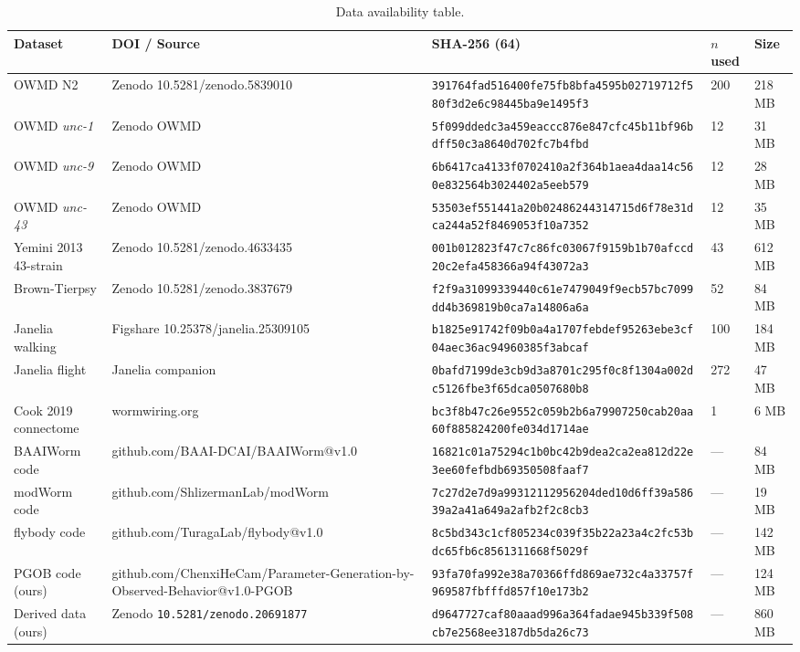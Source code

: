\documentclass[11pt]{article}
\begin{document}
\begin{table}[H]\centering\tiny
\begin{tabular}{p{} p{} p{} p{} p{}}\toprule
Dataset & DOI / Source & SHA-256 (64) & $n$ used & Size \\\midrule
OWMD N2 & Zenodo 10.5281/zenodo.5839010 & \texttt{391764fad516400fe75fb8bfa4595b02719712f580f3d2e6c98445ba9e1495f3} & 200 & 218 MB \\
OWMD \textit{unc-1} & Zenodo OWMD & \texttt{5f099ddedc3a459eaccc876e847cfc45b11bf96bdff50c3a8640d702fc7b4fbd} & 12 & 31 MB \\
OWMD \textit{unc-9} & Zenodo OWMD & \texttt{6b6417ca4133f0702410a2f364b1aea4daa14c560e832564b3024402a5eeb579} & 12 & 28 MB \\
OWMD \textit{unc-43} & Zenodo OWMD & \texttt{53503ef551441a20b02486244314715d6f78e31dca244a52f8469053f10a7352} & 12 & 35 MB \\
Yemini 2013 43-strain & Zenodo 10.5281/zenodo.4633435 & \texttt{001b012823f47c7c86fc03067f9159b1b70afccd20c2efa458366a94f43072a3} & 43 & 612 MB \\
Brown-Tierpsy & Zenodo 10.5281/zenodo.3837679 & \texttt{f2f9a31099339440c61e7479049f9ecb57bc7099dd4b369819b0ca7a14806a6a} & 52 & 84 MB \\
Janelia walking & Figshare 10.25378/janelia.25309105 & \texttt{b1825e91742f09b0a4a1707febdef95263ebe3cf04aec36ac94960385f3abcaf} & 100 & 184 MB \\
Janelia flight & Janelia companion & \texttt{0bafd7199de3cb9d3a8701c295f0c8f1304a002dc5126fbe3f65dca0507680b8} & 272 & 47 MB \\
Cook 2019 connectome & wormwiring.org & \texttt{bc3f8b47c26e9552c059b2b6a79907250cab20aa60f885824200fe034d1714ae} & 1 & 6 MB \\
BAAIWorm code & github.com/BAAI-DCAI/BAAIWorm@v1.0 & \texttt{16821c01a75294c1b0bc42b9dea2ca2ea812d22e3ee60fefbdb69350508faaf7} & --- & 84 MB \\
modWorm code & github.com/ShlizermanLab/modWorm & \texttt{7c27d2e7d9a99312112956204ded10d6ff39a58639a2a41a649a2afb2f2c8cb3} & --- & 19 MB \\
flybody code & github.com/TuragaLab/flybody@v1.0 & \texttt{8c5bd343c1cf805234c039f35b22a23a4c2fc53bdc65fb6c8561311668f5029f} & --- & 142 MB \\
PGOB code (ours) & github.com/ChenxiHeCam/Parameter-Generation-by-Observed-Behavior@v1.0-PGOB & \texttt{93fa70fa992e38a70366ffd869ae732c4a33757f969587fbfffd857f10e173b2} & --- & 124 MB \\
Derived data (ours) & Zenodo \texttt{10.5281/zenodo.20691877} & \texttt{d9647727caf80aaad996a364fadae945b339f508cb7e2568ee3187db5da26c73} & --- & 860 MB \\\bottomrule
\end{tabular}
\caption{Data availability table.}
\end{table}
\end{document}
